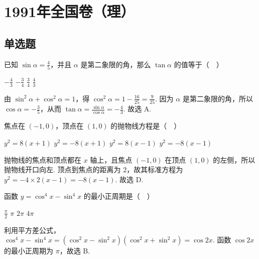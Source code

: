 \documentclass[UTF8,a4paper,oneside,11pt]{ctexbook}
\begin{document}
\mainmatter

\chapter{1991年全国卷（理）}
\section{单选题}

\begin{problem}
已知 \(\sin \alpha = \frac{4}{5}\)，并且 \(\alpha\) 是第二象限的角，那么 \(\tan \alpha\) 的值等于（\(\quad\)）

\choices
    {\(-\frac{4}{3}\)}
    {\(-\frac{3}{4}\)}
    {\(\frac{3}{4}\)}
    {\(\frac{4}{3}\)}


\begin{solution}
由 \(\sin^2\alpha+\cos^2\alpha=1\)，得 \(\cos^2\alpha=1-\frac{16}{25}=\frac{9}{25}\). 因为 \(\alpha\) 是第二象限的角，所以 \(\cos\alpha=-\frac{3}{5}\)，从而 \(\tan\alpha=\frac{\sin\alpha}{\cos\alpha}=-\frac{4}{3}\). 故选 A.
\end{solution}
\end{problem}

\begin{problem}
焦点在 \(\left(-1,0\right)\)，顶点在 \(\left(1,0\right)\) 的抛物线方程是（\(\quad\)）

\choices
    {\(y^{2}=8\left(x+1\right)\)}
    {\(y^{2}=-8\left(x+1\right)\)}
    {\(y^{2}=8\left(x-1\right)\)}
    {\(y^{2}=-8\left(x-1\right)\)}


\begin{solution}
抛物线的焦点和顶点都在 \(x\) 轴上，且焦点 \((-1,0)\) 在顶点 \((1,0)\) 的左侧，所以抛物线开口向左. 顶点到焦点的距离为 \(2\)，故其标准方程为 \(y^2=-4\times2\left(x-1\right)=-8\left(x-1\right)\). 故选 D.
\end{solution}
\end{problem}

\begin{problem}
函数 \(y=\cos^4 x-\sin^4 x\) 的最小正周期是（\(\quad\)）

\choices
    {\(\frac{\pi}{2}\)}
    {\(\pi\)}
    {\(2\pi\)}
    {\(4\pi\)}


\begin{solution}
利用平方差公式，\(\cos^4x-\sin^4x=\left(\cos^2x-\sin^2x\right)\left(\cos^2x+\sin^2x\right)=\cos2x\). 函数 \(\cos2x\) 的最小正周期为 \(\pi\)，故选 B.
\end{solution}
\end{problem}
\end{document}
